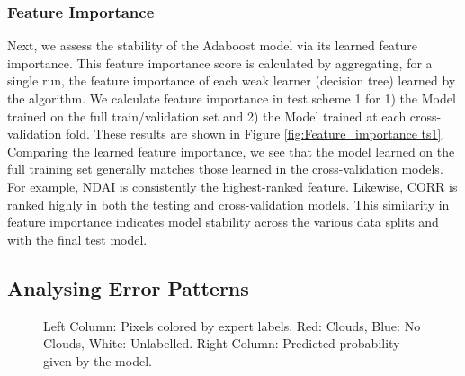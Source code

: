 \documentclass[11pt, letterpaper, journal]{IEEEtran}
\begin{document}
\subsubsection{Feature Importance}
Next, we assess the stability of the Adaboost model via its learned feature importance. This feature importance score is calculated by aggregating, for a single run, the feature importance of each weak learner (decision tree) learned by the algorithm. We calculate feature importance in test scheme 1 for 1) the Model trained on the full train/validation set and 2) the Model trained at each cross-validation fold. These results are shown in Figure \ref{fig:Feature_importance ts1}. Comparing the learned feature importance, we see that the model learned on the full training set generally matches those learned in the cross-validation models. For example, NDAI is consistently the highest-ranked feature. Likewise, CORR is ranked highly in both the testing and cross-validation models. This similarity in feature importance indicates model stability across the various data splits and with the final test model. 

\subsection{Analysing Error Patterns}
\begin{figure}
    \centering
    \qquad
    \qquad
    \caption{Left Column: Pixels colored by expert labels, Red: Clouds, Blue: No Clouds, White: Unlabelled. Right Column: Predicted probability given by the model.}
    \label{fig:Probability_Preds}
\end{figure}
\end{document}
